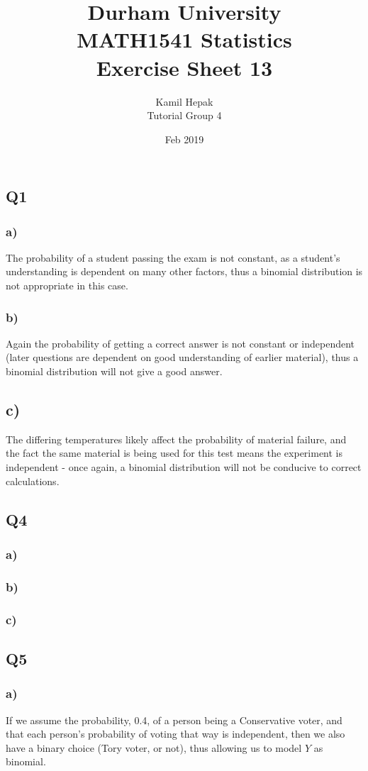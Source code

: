 \documentclass[]{article}
\title{\vspace{-3.0cm}Durham University\\
    MATH1541 Statistics \\
	Exercise Sheet 13}
\author{Kamil Hepak\\
        Tutorial Group 4}
\date{Feb 2019}
\begin{document}
\maketitle

\subsection{Q1}
\subsubsection{a)}
The probability of a student passing the exam is not constant, as a student's understanding is dependent on many other factors, thus a binomial distribution is not appropriate in this case.
\subsubsection{b)}
Again the probability of getting a correct answer is not constant or independent (later questions are dependent on good understanding of earlier material), thus a binomial distribution will not give a good answer.
\subsection{c)}
The differing temperatures likely affect the probability of material failure, and the fact the same material is being used for this test means the experiment is independent - once again, a binomial distribution will not be conducive to correct calculations.

\subsection{Q4}
\subsubsection{a)}
\subsubsection{b)}
\subsubsection{c)}

\subsection{Q5}
\subsubsection{a)}
If we assume the probability, 0.4, of a person being a Conservative voter, and that each person's probability of voting that way is independent, then we also have a binary choice (Tory voter, or not), thus allowing us to model $Y$ as binomial.
\end{document}
